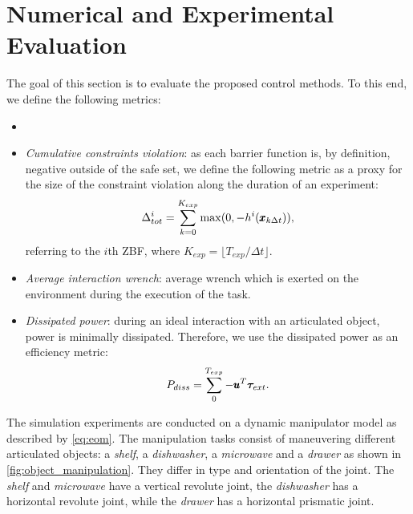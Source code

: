 \section{Numerical and Experimental Evaluation} \label{sec:experiments}

The goal of this section is to evaluate the proposed control methods. To this end, we define the following metrics:
\begin{itemize}
    \ifreview
    \item {}  
    \fi
    \item \textit{Cumulative constraints violation}: as each barrier function is, by definition, negative outside of the safe set, we define the following metric as a proxy for the size of the constraint violation along the duration of an experiment:
    \begin{equation*}
        \Delta^{i}_{tot} = \sum\limits_{k=0}^{K_{exp}} \max(0, -h^i(\pmb{x}_{k \Delta t})),
    \end{equation*}
    referring to the $i$th ZBF, where $K_{exp} = \lfloor T_{exp} / \Delta t \rfloor$.
    \item \textit{Average interaction wrench}: average wrench which is exerted on the environment during the execution of the task.
    \item \textit{Dissipated power}: during an ideal interaction with an articulated object, power is minimally dissipated. Therefore, we use the dissipated power as an efficiency metric:
    \begin{equation}
        P_{diss} = \sum\limits_{0}^{T_{exp}} -\pmb{u}^T \boldsymbol{\tau}_{ext}.
    \end{equation}
\end{itemize}
The simulation experiments are conducted on a dynamic manipulator model as described by \eqref{eq:eom}. The manipulation tasks consist of maneuvering different articulated objects: a \textit{shelf}, a \textit{dishwasher}, a \textit{microwave} and a \textit{drawer} as shown in \fig\ref{fig:object_manipulation}. They differ in type and orientation of the joint. The \textit{shelf} and \textit{microwave} have a vertical revolute joint, the \textit{dishwasher} has a horizontal revolute joint, while the \textit{drawer} has a horizontal prismatic joint.
  
